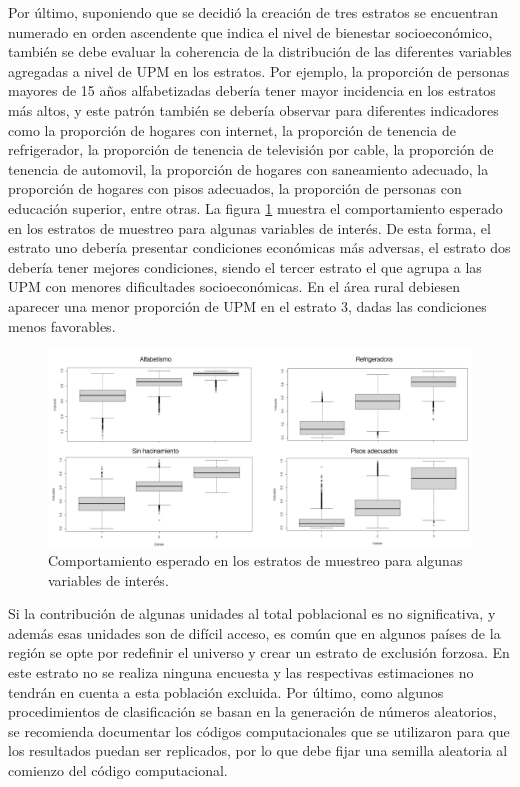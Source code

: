 \documentclass[
  10pt,
  spanish,
]{book}
\begin{document}
Por último, suponiendo que se decidió la creación de tres estratos se encuentran numerado en orden ascendente que indica el nivel de bienestar socioeconómico, también se debe evaluar la coherencia de la distribución de las diferentes variables agregadas a nivel de UPM en los estratos. Por ejemplo, la proporción de personas mayores de 15 años alfabetizadas debería tener mayor incidencia en los estratos más altos, y este patrón también se debería observar para diferentes indicadores como la proporción de hogares con internet, la proporción de tenencia de refrigerador, la proporción de tenencia de televisión por cable, la proporción de tenencia de automovil, la proporción de hogares con saneamiento adecuado, la proporción de hogares con pisos adecuados, la proporción de personas con educación superior, entre otras. La figura \ref{fig:estrata} muestra el comportamiento esperado en los estratos de muestreo para algunas variables de interés. De esta forma, el estrato uno debería presentar condiciones económicas más adversas, el estrato dos debería tener mejores condiciones, siendo el tercer estrato el que agrupa a las UPM con menores dificultades socioeconómicas. En el área rural debiesen aparecer una menor proporción de UPM en el estrato 3, dadas las condiciones menos favorables.

\begin{figure}
\includegraphics[width=800px]{Pics/Estratificar} \caption{Comportamiento esperado en los estratos de muestreo para algunas variables de interés.}\label{fig:estrata}
\end{figure}

Si la contribución de algunas unidades al total poblacional es no significativa, y además esas unidades son de difícil acceso, es común que en algunos países de la región se opte por redefinir el universo y crear un estrato de exclusión forzosa. En este estrato no se realiza ninguna encuesta y las respectivas estimaciones no tendrán en cuenta a esta población excluida. Por último, como algunos procedimientos de clasificación se basan en la generación de números aleatorios, se recomienda documentar los códigos computacionales que se utilizaron para que los resultados puedan ser replicados, por lo que debe fijar una semilla aleatoria al comienzo del código computacional.
\end{document}
